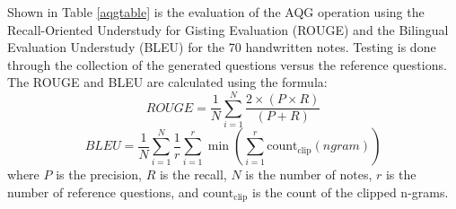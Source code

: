 \documentclass[conference]{IEEEtran}
\begin{document}
\indent Shown in Table \ref{aqgtable} is the evaluation of the AQG operation
using the Recall-Oriented Understudy for Gisting Evaluation (ROUGE) and the
Bilingual Evaluation Understudy (BLEU) for the 70 handwritten notes.
Testing is done through the collection of the generated questions versus the
reference questions. The ROUGE and BLEU are calculated using the formula:
\begin{equation}
    ROUGE = \frac{1}{N} \sum_{i=1}^{N} \frac{2 \times (P \times R)}{(P + R)}
\end{equation}
\begin{equation}
    BLEU = \frac{1}{N} \sum_{i=1}^{N} \frac{1}{r} \sum_{i=1}^{r} \min \left( \sum_{i=1}^{r} \text{count}_{\text{clip}}(ngram) \right)
\end{equation}
where $P$ is the precision, $R$ is the recall, $N$ is the number of notes, $r$ is the number of reference questions, and $\text{count}_{\text{clip}}$ is the count of the clipped n-grams.
\end{document}
